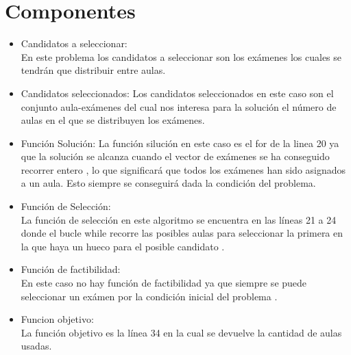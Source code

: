 \documentclass[11pt,openany]{book}
\begin{document}
\section{Componentes}
\begin{itemize}
      \item Candidatos a seleccionar:\\
            En este problema los candidatos a seleccionar son los exámenes 
            los cuales se tendrán que distribuir entre aulas.
      \item Candidatos seleccionados:
            Los candidatos seleccionados en este caso son el conjunto aula-exámenes
            del cual nos interesa para la solución el número de aulas en el que se distribuyen los exámenes.

      \item Función Solución:
            La función silución en este caso es el for de la linea 20
            ya que la solución se alcanza cuando el vector de 
            exámenes se ha conseguido recorrer entero , lo que significará que 
            todos los exámenes han sido asignados a un aula.
            Esto siempre se conseguirá dada la condición del problema.
            

      \item Función de Selección:\\ 
            La función de selección en este algoritmo se encuentra
            en las líneas 21 a 24 donde el bucle while recorre las 
            posibles aulas para seleccionar la primera en la que haya 
            un hueco para el posible candidato .

      \item Función de factibilidad:\\
            
            

            En este caso no hay función de factibilidad ya que siempre se puede seleccionar un exámen por la 
            condición inicial del problema .


      \item Funcion objetivo: \\
            La función objetivo es la línea 34 en la cual se devuelve la cantidad de aulas usadas.

\end{itemize}
\end{document}
